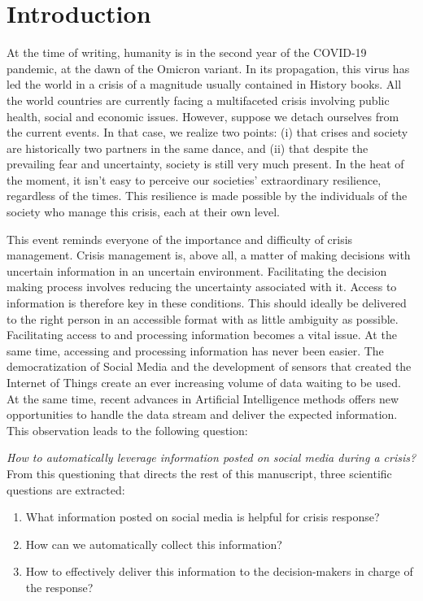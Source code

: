 \chapter*{Introduction}
At the time of writing, humanity is in the second year of the COVID-19 pandemic, at the dawn of the Omicron variant.
In its propagation, this virus has led the world in a crisis of a magnitude usually contained in History books.
All the world countries are currently facing a multifaceted crisis involving public health, social and economic issues.
However, suppose we detach ourselves from the current events.
In that case, we realize two points: (i) that crises and society are historically two partners in the same dance, and (ii) that despite the prevailing fear and uncertainty, society is still very much present.
In the heat of the moment, it isn't easy to perceive our societies' extraordinary resilience, regardless of the times.
This resilience is made possible by the individuals of the society who manage this crisis, each at their own level.

This event reminds everyone of the importance and difficulty of crisis management.
Crisis management is, above all, a matter of making decisions with uncertain information in an uncertain environment.
Facilitating the decision making process involves reducing the uncertainty associated with it.
Access to information is therefore key in these conditions.
This should ideally be delivered to the right person in an accessible format with as little ambiguity as possible.
Facilitating access to and processing information becomes a vital issue.
At the same time, accessing and processing information has never been easier.
The democratization of Social Media and the development of sensors that created the Internet of Things create an ever increasing volume of data waiting to be used.
At the same time, recent advances in Artificial Intelligence methods offers new opportunities to handle the data stream and deliver the expected information.
This observation leads to the following question:

\emph{How to automatically leverage information posted on social media during a crisis?}
From this questioning that directs the rest of this manuscript, three scientific questions are extracted:

\begin{enumerate}
    \item What information posted on social media is helpful for crisis response?
    \item How can we automatically collect this information?
    \item How to effectively deliver this information to the decision-makers in charge of the response?
\end{enumerate}

